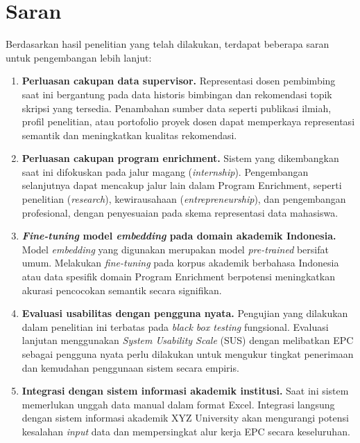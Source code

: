 \section{Saran}

Berdasarkan hasil penelitian yang telah dilakukan, terdapat beberapa saran untuk pengembangan lebih lanjut:

\begin{enumerate}
    \item \textbf{Perluasan cakupan data supervisor.} Representasi dosen pembimbing saat ini bergantung pada data historis bimbingan dan rekomendasi topik skripsi yang tersedia. Penambahan sumber data seperti publikasi ilmiah, profil penelitian, atau portofolio proyek dosen dapat memperkaya representasi semantik dan meningkatkan kualitas rekomendasi.

    \item \textbf{Perluasan cakupan program enrichment.} Sistem yang dikembangkan saat ini difokuskan pada jalur magang (\textit{internship}). Pengembangan selanjutnya dapat mencakup jalur lain dalam Program Enrichment, seperti penelitian (\textit{research}), kewirausahaan (\textit{entrepreneurship}), dan pengembangan profesional, dengan penyesuaian pada skema representasi data mahasiswa.

    \item \textbf{\textit{Fine-tuning} model \textit{embedding} pada domain akademik Indonesia.} Model \textit{embedding} yang digunakan merupakan model \textit{pre-trained} bersifat umum. Melakukan \textit{fine-tuning} pada korpus akademik berbahasa Indonesia atau data spesifik domain Program Enrichment berpotensi meningkatkan akurasi pencocokan semantik secara signifikan.

    \item \textbf{Evaluasi usabilitas dengan pengguna nyata.} Pengujian yang dilakukan dalam penelitian ini terbatas pada \textit{black box testing} fungsional. Evaluasi lanjutan menggunakan \textit{System Usability Scale} (SUS) dengan melibatkan EPC sebagai pengguna nyata perlu dilakukan untuk mengukur tingkat penerimaan dan kemudahan penggunaan sistem secara empiris.

    \item \textbf{Integrasi dengan sistem informasi akademik institusi.} Saat ini sistem memerlukan unggah data manual dalam format Excel. Integrasi langsung dengan sistem informasi akademik XYZ University akan mengurangi potensi kesalahan \textit{input} data dan mempersingkat alur kerja EPC secara keseluruhan.


\end{enumerate}
